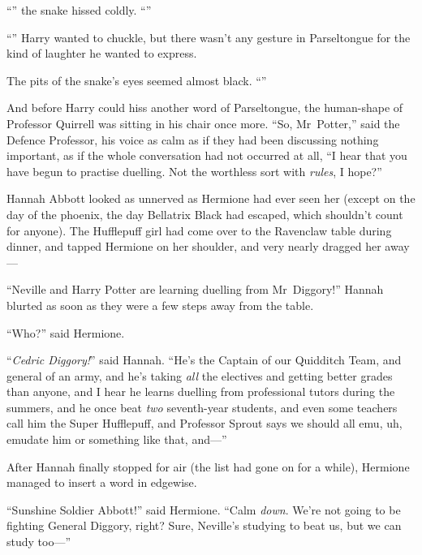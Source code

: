 “” the snake hissed coldly. “”

“” Harry wanted to chuckle, but there wasn’t any gesture in Parseltongue for the kind of laughter he wanted to express.

The pits of the snake’s eyes seemed almost black. “”

And before Harry could hiss another word of Parseltongue, the human-shape of Professor Quirrell was sitting in his chair once more. “So, Mr~Potter,” said the Defence Professor, his voice as calm as if they had been discussing nothing important, as if the whole conversation had not occurred at all, “I hear that you have begun to practise duelling. Not the worthless sort with \emph{rules}, I hope?”

\later

Hannah Abbott looked as unnerved as Hermione had ever seen her (except on the day of the phoenix, the day Bellatrix Black had escaped, which shouldn’t count for anyone). The Hufflepuff girl had come over to the Ravenclaw table during dinner, and tapped Hermione on her shoulder, and very nearly dragged her away—

“Neville and Harry Potter are learning duelling from Mr~Diggory!” Hannah blurted as soon as they were a few steps away from the table.

“Who?” said Hermione.

“\emph{Cedric Diggory!}” said Hannah. “He’s the Captain of our Quidditch Team, and general of an army, and he’s taking \emph{all} the electives and getting better grades than anyone, and I hear he learns duelling from professional tutors during the summers, and he once beat \emph{two} seventh-year students, and even some teachers call him the Super Hufflepuff, and Professor Sprout says we should all emu, uh, emudate him or something like that, and—”

After Hannah finally stopped for air (the list had gone on for a while), Hermione managed to insert a word in edgewise.

“Sunshine Soldier Abbott!” said Hermione. “Calm \emph{down}. We’re not going to be fighting General Diggory, right? Sure, Neville’s studying to beat us, but we can study too—”


